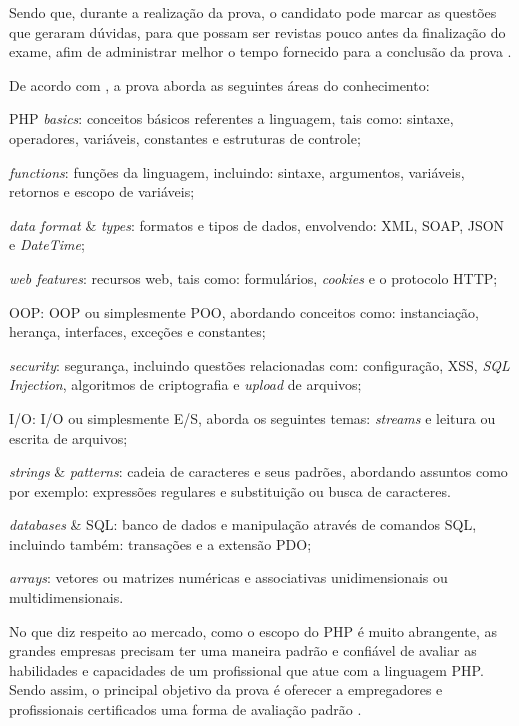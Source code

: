 Sendo que, durante a realização da prova, o candidato pode marcar as questões
que geraram dúvidas, para que possam ser revistas pouco antes da finalização do
exame, afim de administrar melhor o tempo fornecido para a conclusão da  prova
\cite{entrevistaAriZCEBrasil}.

De acordo com , a prova aborda as seguintes
áreas do conhecimento:

\begin{alineas}
    \item \acs{PHP} \textit{basics}: conceitos básicos referentes a
    linguagem, tais como: sintaxe, operadores, variáveis, constantes e
    estruturas de controle;
    \item \textit{functions}: funções da linguagem, incluindo: sintaxe,
    argumentos, variáveis, retornos e escopo de variáveis;
    \item \textit{data format} \& \textit{types}: formatos e tipos de
    dados, envolvendo: \ac{XML}, \ac{SOAP}, \ac{JSON} e \textit{DateTime};
    \item \textit{web features}: recursos web, tais como: formulários,
    \textit{cookies} e o protocolo \ac{HTTP};
    \item \acs{OOP}: \acl{OOP} ou simplesmente \ac{POO},
    abordando conceitos como: instanciação, herança, interfaces, exceções e
    constantes;
    \item \textit{security}: segurança, incluindo questões relacionadas com:
    configuração, \ac{XSS}, \textit{\acs{SQL} Injection},
    algoritmos de criptografia e \textit{upload} de arquivos;
    \item \acs{I/O}: \acl{I/O} ou simplesmente \ac{E/S}, aborda os seguintes
    temas: \textit{streams} e leitura ou escrita de arquivos;
    \item \textit{strings} \& \textit{patterns}: cadeia de caracteres e
    seus padrões, abordando assuntos como por exemplo: expressões
    regulares e substituição ou busca de caracteres.
    \item \textit{databases} \& \acs{SQL}: banco de dados e
    manipulação através de comandos \ac{SQL}, incluindo também: transações e a
    extensão \ac{PDO};
    \item \textit{arrays}: vetores ou matrizes numéricas e
    associativas unidimensionais ou multidimensionais.
\end{alineas}

No que diz respeito ao mercado, como o escopo do \acs{PHP} é muito abrangente,
as grandes empresas precisam ter uma maneira padrão e confiável de avaliar as
habilidades e capacidades de um profissional que atue com a linguagem PHP.
Sendo assim, o principal objetivo da prova é oferecer a empregadores e profissionais
certificados uma forma de avaliação padrão \cite{zendPhp5CertificationStudyGuide}.

